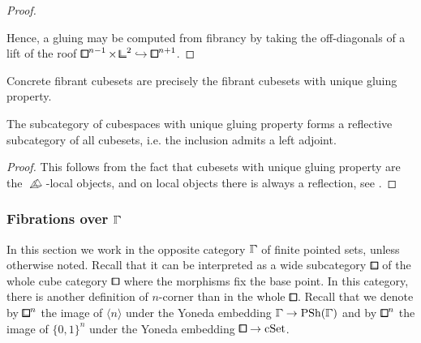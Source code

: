 \begin{proof}
\begin{center}
\end{center}
Hence, a gluing may be computed from fibrancy by taking the off-diagonals of a lift of the roof
$\bbox^{n-1}\times \bbcor^2\hookrightarrow \bbox^{n+1}$.
\end{proof}

\begin{corollary}
Concrete fibrant cubesets are precisely the fibrant cubesets with unique gluing property.
\end{corollary}

\begin{lemma}
The subcategory of cubespaces with unique gluing property forms a reflective subcategory of all cubesets, i.e. the inclusion admits a left adjoint.
\end{lemma}

\begin{proof}
This follows from the fact that cubesets with unique gluing property are the $\bprism$-local objects,
and on local objects there is always a reflection, see \cite[Theorem 1.39]{Adamek1994}.
\end{proof}



\subsubsection{Fibrations over \texorpdfstring{$\bbGamma$}{Gamma}}\label{ssec:corner-gamma}

In this section we work in the opposite category $\bbGamma$ of finite pointed sets, unless otherwise noted.
Recall that it can be interpreted as a wide subcategory $\bblox$ of the whole cube category $\bbox$
where the morphisms fix the base point.
In this category, there is another definition of $n$-corner than in the whole $\bbox$.
Recall that we denote by ${\bblox}^n$ the image of $\langle n\rangle$ under the Yoneda embedding
$\bbGamma\to\PSh(\bbGamma)$ and by ${\bbox}^n$ the image of $\{0,1\}^n$ under the Yoneda embedding
$\bbox\to\cSet$.

